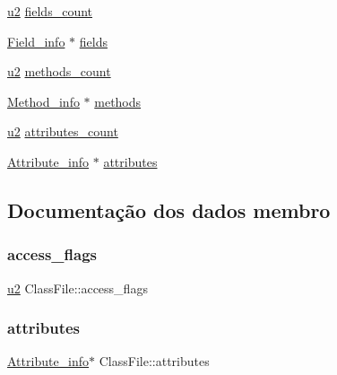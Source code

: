 \begin{DoxyCompactItemize}
\hyperlink{util_8h_a55ef8d87fd202b8417704c089899c5b9}{u2} \hyperlink{struct_class_file_acea207ee523fbc16611d3cf436c390e0}{fields\+\_\+count}
\item 
\hyperlink{struct_field__info}{Field\+\_\+info} $\ast$ \hyperlink{struct_class_file_a6d6ec8aa668982ea722edc40b3ea5b1a}{fields}
\item 
\hyperlink{util_8h_a55ef8d87fd202b8417704c089899c5b9}{u2} \hyperlink{struct_class_file_aacfb45d4af64216324b1ae5269c870d5}{methods\+\_\+count}
\item 
\hyperlink{struct_method__info}{Method\+\_\+info} $\ast$ \hyperlink{struct_class_file_a5906980e6c5121e5a864346fd3617083}{methods}
\item 
\hyperlink{util_8h_a55ef8d87fd202b8417704c089899c5b9}{u2} \hyperlink{struct_class_file_a633c696fbe08e7e7906b2ab1e52f3d1b}{attributes\+\_\+count}
\item 
\hyperlink{struct_attribute__info}{Attribute\+\_\+info} $\ast$ \hyperlink{struct_class_file_a20d4b18030becbd8df5b7584477e94b6}{attributes}
\end{DoxyCompactItemize}


\subsection{Documentação dos dados membro}
\mbox{\label{struct_class_file_ae88db578147f7ee0d6fc1aeacb341854}} 
\subsubsection{\texorpdfstring{access\+\_\+flags}{access\_flags}}
{\footnotesize\ttfamily \hyperlink{util_8h_a55ef8d87fd202b8417704c089899c5b9}{u2} Class\+File\+::access\+\_\+flags}

\mbox{\label{struct_class_file_a20d4b18030becbd8df5b7584477e94b6}} 
\subsubsection{\texorpdfstring{attributes}{attributes}}
{\footnotesize\ttfamily \hyperlink{struct_attribute__info}{Attribute\+\_\+info}$\ast$ Class\+File\+::attributes}

